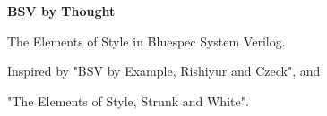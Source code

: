 \begin{titlepage}
    \begin{flushleft}
        \vspace*{3.5cm}
 
        \vspace{1.5cm}
        \textbf{\Huge{\color{myred}BSV by Thought}}
             
        \vspace{1cm}
 
        The Elements of Style in Bluespec System Verilog.
        
         \vspace{1cm}
        Inspired by "BSV by Example, Rishiyur and Czeck", and
        
        "The Elements of Style, Strunk and White".
 
        \vfill
             
    \end{flushleft}
 \end{titlepage}